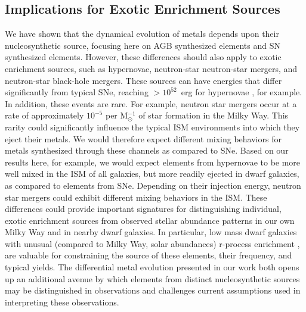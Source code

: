 \subsection{Implications for Exotic Enrichment Sources}
\label{ch3:sec:exotic enrichment}
We have shown that the dynamical evolution of metals depends upon their nucleosynthetic source, focusing here on AGB synthesized elements and SN synthesized elements. However, these differences should also apply to exotic enrichment sources, such as hypernovae, neutron-star neutron-star mergers, and neutron-star black-hole mergers. These sources can have energies that differ significantly from typical SNe, reaching $> 10^{52}$~erg for hypernovae \citep{Nomoto2004}, for example. In addition,
     these events are rare.  For example, neutron star mergers occur
     at a rate of approximately $10^{-5}$ per M$_{\odot}^{-1}$ of star
     formation in the Milky Way\citep{Kim2015}.  This rarity could
significantly influence the typical ISM environments into which they eject their metals. We would therefore expect different mixing behaviors for metals synthesized through these channels as compared to SNe. Based on our results here, for example, we would expect elements from hypernovae to be more well mixed in the ISM of all galaxies, but more readily ejected in dwarf galaxies, as compared to elements from SNe.
Depending on their injection energy, neutron star mergers could exhibit different mixing behaviors in the ISM. These differences could provide important signatures for distinguishing individual, exotic enrichment sources from observed stellar abundance patterns in our own Milky Way and in nearby dwarf galaxies. In particular, low mass dwarf galaxies with unusual (compared to Milky Way, solar abundances) r-process enrichment \citep[e.g.][]{Ji2016,Duggan2018,Ji2019}, are valuable for constraining the source of these elements, their frequency, and typical yields. The differential metal evolution presented in our work both opens up an additional avenue by which elements from distinct nucleosynthetic sources may be distinguished in observations and challenges current assumptions used in interpreting these observations.

